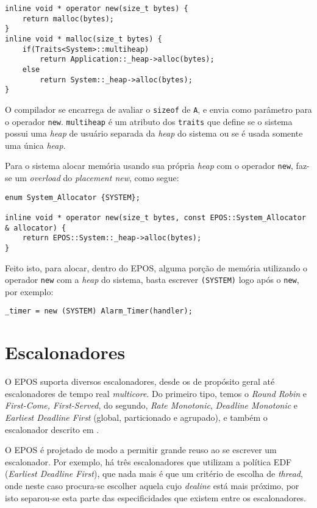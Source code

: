 \begin{lstlisting}
inline void * operator new(size_t bytes) {
    return malloc(bytes);
}
inline void * malloc(size_t bytes) {
    if(Traits<System>::multiheap)
        return Application::_heap->alloc(bytes);
    else
        return System::_heap->alloc(bytes);
}
\end{lstlisting}

O compilador se encarrega de avaliar o \verb+sizeof+ de \verb+A+, e envia como parâmetro para o operador \verb+new+. \verb+multiheap+ é um atributo dos \verb+traits+ que define se o sistema possui uma \emph{heap} de usuário separada da \emph{heap} do sistema ou se é usada somente uma única \emph{heap}.

Para o sistema alocar memória usando sua própria \emph{heap} com o operador \verb+new+, faz-se um \emph{overload} do \emph{placement new}, como segue:

\begin{lstlisting}
enum System_Allocator {SYSTEM};

inline void * operator new(size_t bytes, const EPOS::System_Allocator & allocator) {
    return EPOS::System::_heap->alloc(bytes);
}
\end{lstlisting}

Feito isto, para alocar, dentro do EPOS, alguma porção de memória utilizando o operador \verb+new+ com a \emph{heap} do sistema, basta escrever \verb+(SYSTEM)+ logo após o \verb+new+, por exemplo:

\begin{lstlisting}
_timer = new (SYSTEM) Alarm_Timer(handler);
\end{lstlisting}


\section{Escalonadores}

O EPOS suporta diversos escalonadores, desde os de propósito geral até escalonadores de tempo real \emph{multicore}.
Do primeiro tipo, temos o \emph{Round Robin} e \emph{First-Come, First-Served}, do segundo, \emph{Rate Monotonic}, \emph{Deadline Monotonic} e \emph{Earliest Deadline First} (global, particionado e agrupado), e também o escalonador descrito em \cite{gio}.


O EPOS é projetado de modo a permitir grande reuso ao se escrever um escalonador. Por exemplo, há três escalonadores que utilizam a política EDF (\emph{Earliest Deadline First}), que nada mais é que um critério de escolha de \emph{thread}, onde neste caso procura-se escolher aquela cujo \emph{dealine} está mais próximo, por isto separou-se esta parte das especificidades que existem entre os escalonadores. 

